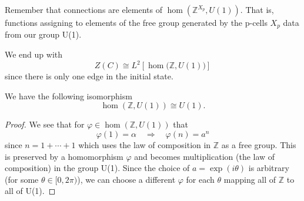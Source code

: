 \begin{rmk}
Remember that connections are elements of
$\hom(\mathbb{Z}^{X_{p}},U(1))$. That is, functions assigning to
elements of the free group generated by the p-cells $X_{p}$ data
from our group U(1).
\end{rmk}

We end up with
\begin{equation}%
Z(C)\cong L^{2}\left[\hom\Big(\mathbb{Z},U(1)\Big)\right]
\end{equation}
since there is only one edge in the initial state.

\begin{prop}%
We have the following isomorphism
\begin{equation}%
\hom(\mathbb{Z},U(1))\cong U(1).
\end{equation}
\end{prop}
\begin{proof}
We see that for $\varphi\in\hom(\mathbb{Z},U(1))$ that
\begin{equation}%
\varphi(1)=\alpha\quad\Rightarrow\quad \varphi(n)=a^{n}
\end{equation}
since $n=1+\cdots+1$ which uses the law of composition in
$\mathbb{Z}$ as a free group. This is preserved by a homomorphism
$\varphi$ and becomes multiplication (the law of composition) in
the group U(1). Since the choice of $a=\exp(i\theta)$ is
arbitrary (for some $\theta\in[0,2\pi)$), we can choose a
  different $\varphi$ for each $\theta$ mapping all of
  $\mathbb{Z}$ to all of U(1).
\end{proof}
\begin{comment}
\begin{proof}
The proof is more or less roundabout. We know that an element of
$U(1)$ looks like $\exp(i\theta)$ for some
$\theta\in\mathbb{R}$. We know we can construct $\mathbb{R}$ from
$\mathbb{Q}$, and we can construct $\mathbb{Q}$ from
$\mathbb{Z}$. So we consider a family of homomorphisms
\begin{equation}%
\phi_{m}(n)=\exp(in/m)\in\hom(\mathbb{Z},U(1))
\end{equation}
which really gives us two degrees of freedom to play around with:
$m$ and $n$. This is precisely just $(n/m)\in\mathbb{Q}$. This
allows us to embed
\begin{equation}%
\hom(\mathbb{Q},U(1))\subseteq\hom(\mathbb{Z},U(1))
\end{equation}
We can construct from $\mathbb{Q}$ the reals, which allows us to
have an isomorphism
$\hom(\mathbb{Q},U(1))\cong\hom(\mathbb{R},U(1))$ but this is
precisely $U(1)$. Thus by our deduction, there is an
isomorphism from $\hom(\mathbb{R},U(1))$ to a subset of
$\hom(\mathbb{Z},U(1))$, and there is the obvious isomorphism
$\hom(\mathbb{R},U(1))\cong U(1)$ which proves the hypothesis.
\end{proof}
\end{comment}

